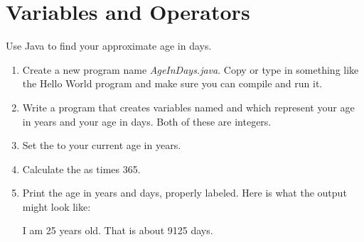 \chapter{Variables and Operators}
\label{variables}

\begin{exercise}
\label{ex:age}
Use Java to find your approximate age in days.

\begin{enumerate}

\item Create a new program name {\it AgeInDays.java}.
Copy or type in something like the Hello World program and make sure you can compile and run it.

\item Write a program that creates variables named  and  which represent your age in years and your age in days. Both of these are integers.

\item Set the  to your current age in years.

\item Calculate the  as  times 365.

\item Print the age in years and days, properly labeled. Here is what the output might look like:

\begin{stdout}
I am 25 years old.
That is about 9125 days.
\end{stdout}
\end{enumerate}

\end{exercise}



